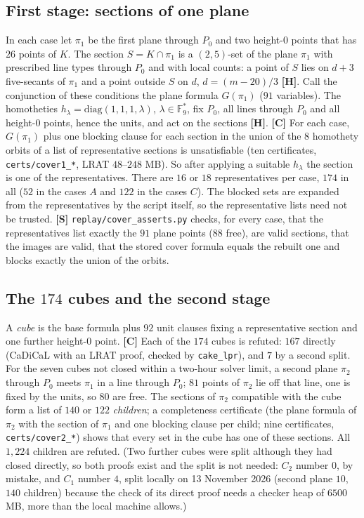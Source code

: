 \documentclass[11pt]{article}
\theoremstyle{plain}
\theoremstyle{remark}
\newcommand{\F}{\mathbb F}
\newcommand{\file}[1]{\texttt{#1}}
\begin{document}
\subsection{First stage: sections of one plane}
In each case let $\pi_1$ be the first plane through $P_0$ and two height-$0$ points that has $26$ points of $K$.
The section $S=K\cap\pi_1$ is a $(2,5)$-set of the plane $\pi_1$ with prescribed line types through $P_0$ and with local counts: a point of $S$ lies on $d+3$ five-secants of $\pi_1$ and a point outside $S$ on $d$, $d=(m-20)/3$ \textbf{[H]}.
Call the conjunction of these conditions the plane formula $G(\pi_1)$ ($91$ variables).
The homotheties $h_\lambda=\mathrm{diag}(1,1,1,\lambda)$, $\lambda\in\F_9^*$, fix $P_0$, all lines through $P_0$ and all height-$0$ points, hence the units, and act on the sections \textbf{[H]}.
\textbf{[C]} For each case, $G(\pi_1)$ plus one blocking clause for each section in the union of the $8$ homothety orbits of a list of representative sections is unsatisfiable (ten certificates, \file{certs/cover1\_*}, LRAT $48$--$248$ MB).
So after applying a suitable $h_\lambda$ the section is one of the representatives.  There are $16$ or $18$ representatives per case, $174$ in all ($52$ in the cases $A$ and $122$ in the cases $C$).
The blocked sets are expanded from the representatives by the script itself, so the representative lists need not be trusted.
\textbf{[S]} \file{replay/cover\_asserts.py} checks, for every case, that the representatives list exactly the $91$ plane points ($88$ free), are valid sections, that the images are valid, that the stored cover formula equals the rebuilt one and blocks exactly the union of the orbits.

\subsection{The $174$ cubes and the second stage}
A \emph{cube} is the base formula plus $92$ unit clauses fixing a representative section and one further height-$0$ point.
\textbf{[C]} Each of the $174$ cubes is refuted: $167$ directly (CaDiCaL with an LRAT proof, checked by \texttt{cake\_lpr}), and $7$ by a second split.
For the seven cubes not closed within a two-hour solver limit, a second plane $\pi_2$ through $P_0$ meets $\pi_1$ in a line through $P_0$; $81$ points of $\pi_2$ lie off that line, one is fixed by the units, so $80$ are free.
The sections of $\pi_2$ compatible with the cube form a list of $140$ or $122$ \emph{children}; a completeness certificate (the plane formula of $\pi_2$ with the section of $\pi_1$ and one blocking clause per child; nine certificates, \file{certs/cover2\_*}) shows that every set in the cube has one of these sections.
All $1{,}224$ children are refuted.
(Two further cubes were split although they had closed directly, so both proofs exist and the split is not needed: $C_2$ number $0$, by mistake, and $C_1$ number $4$, split locally on 13 November 2026 (second plane $10$, $140$ children) because the check of its direct proof needs a checker heap of $6500$ MB, more than the local machine allows.)
\end{document}
